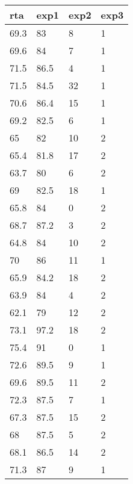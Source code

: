 \documentclass[12pt,spanish]{article}
\begin{document}
\begin{table}[]
\begin{tabular}{@{}llll@{}}
\toprule
rta  & exp1 & exp2 & exp3 \\ \midrule
69.3 & 83   & 8    & 1    \\
69.6 & 84   & 7    & 1    \\
71.5 & 86.5 & 4    & 1    \\
71.5 & 84.5 & 32   & 1    \\
70.6 & 86.4 & 15   & 1    \\
69.2 & 82.5 & 6    & 1    \\
65   & 82   & 10   & 2    \\
65.4 & 81.8 & 17   & 2    \\
63.7 & 80   & 6    & 2    \\
69   & 82.5 & 18   & 1    \\
65.8 & 84   & 0    & 2    \\
68.7 & 87.2 & 3    & 2    \\
64.8 & 84   & 10   & 2    \\
70   & 86   & 11   & 1    \\
65.9 & 84.2 & 18   & 2    \\
63.9 & 84   & 4    & 2    \\
62.1 & 79   & 12   & 2    \\
73.1 & 97.2 & 18   & 2    \\
75.4 & 91   & 0    & 1    \\
72.6 & 89.5 & 9    & 1    \\
69.6 & 89.5 & 11   & 2    \\
72.3 & 87.5 & 7    & 1    \\
67.3 & 87.5 & 15   & 2    \\
68   & 87.5 & 5    & 2    \\
68.1 & 86.5 & 14   & 2    \\
71.3 & 87   & 9    & 1    \\ \bottomrule
\end{tabular}
\end{table}
\end{document}
